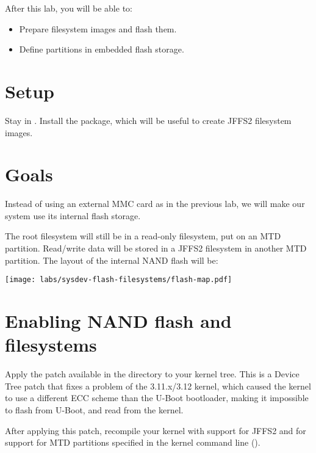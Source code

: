 
After this lab, you will be able to:
\begin{itemize}
\item Prepare filesystem images and flash them.
\item Define partitions in embedded flash storage.
\end{itemize}

\section{Setup}

Stay in . Install the
 package, which will be useful to create JFFS2
filesystem images.

\section{Goals}

Instead of using an external MMC card as in the previous lab, we will
make our system use its internal flash storage.

The root filesystem will still be in a read-only filesystem, put on an
MTD partition.  Read/write data will be stored in a JFFS2 filesystem
in another MTD partition. The layout of the internal NAND flash will
be:

\begin{center}
  \texttt{[image: labs/sysdev-flash-filesystems/flash-map.pdf]}
\end{center}

\section{Enabling NAND flash and filesystems}

Apply the 
patch available in the
 directory to your
kernel tree. This is a Device Tree patch that fixes a problem
of the 3.11.x/3.12 kernel, which caused the kernel to use a
different ECC scheme than the U-Boot bootloader, making it
impossible to flash from U-Boot, and read from the kernel.

After applying this patch, recompile your kernel with support for
JFFS2 and for support for MTD partitions specified in the kernel
command line ().

